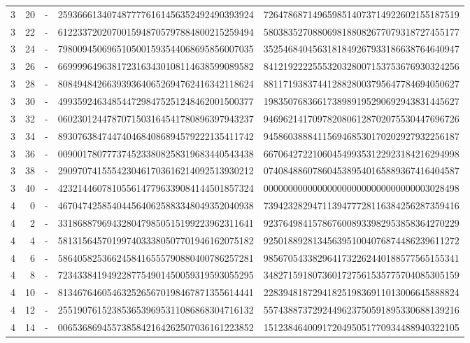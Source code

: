 \begin{longtable}{rrrll}
3 & 20 & - & 2593666134074877776161456352492490393924 & 7264786871496598514073714922602155187519 \\
3 & 22 & - & 6122337202070015948705797884800215259494 & 5803835270880698188082677079318727455177 \\
3 & 24 & - & 7980094506965105001593544068695856007035 & 3525468404563181849267933186638764640947 \\
3 & 26 & - & 6699996496381723163430108114638599089582 & 8412192222555320328007153753676930324256 \\
3 & 28 & - & 8084948426639393640652694762416342118624 & 8811719383744128828003795647784694050627 \\
3 & 30 & - & 4993592463485447298475251248462001500377 & 1983507683661738989195290692943831445627 \\
3 & 32 & - & 0602301244787071503164541780896397943237 & 9469621417097820806128702075530447696726 \\
3 & 34 & - & 8930763847447404684086894579222135411742 & 9458603888411569468530170202927932256187 \\
3 & 36 & - & 0090017807773745233808258319683440543438 & 6670642722106045499353122923184216294998 \\
3 & 38 & - & 2909707415554230461703616214092513930212 & 0740848860786045389540165889367416404587 \\
3 & 40 & - & 4232144607810556147796339084144501857324 & 0000000000000000000000000000000003028498 \\
4 & 0 & - & 4670474258540445640625883348049352040938 & 7394232829471139477728116384256287359416 \\
4 & 2 & - & 3318688796943280479850515199223962311641 & 9237649841578676008933982953858364270229 \\
4 & 4 & - & 5813156457019974033380507701946162075182 & 9250188928134563951004076874486239611272 \\
4 & 6 & - & 5864058253662458416555790880400786257281 & 9856705433829641732262440188577565155341 \\
4 & 8 & - & 7234338419492287754901450059319593055295 & 3482715918073601727561535775704085305159 \\
4 & 10 & - & 8134676460546325265670198467871355614441 & 2283948187294182519836911013006645888824 \\
4 & 12 & - & 2551907615238536539695311086868304716132 & 5574388737292449623750591895330688139216 \\
4 & 14 & - & 0065368694557385842164262507036161223852 & 1512384640091720495051770934488940322105 \\

\end{longtable}
